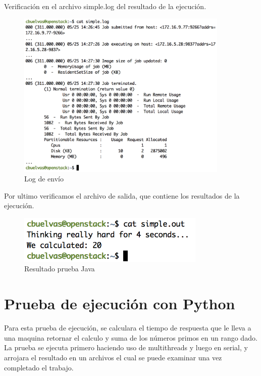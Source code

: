 Verificación en el archivo simple.log del resultado de la ejecución.

\begin{figure}[h]
\centering
\includegraphics[width=0.9\textwidth]{images/sublog.png}
\decoRule
\caption{Log de envío}
\label{fig:file log}
\end{figure}
\FloatBarrier

Por ultimo verificamos el archivo de salida, que contiene los resultados de la ejecución.

\begin{figure}[h]
\centering
\includegraphics[width=0.8\textwidth]{images/simpleout.png}
\decoRule
\caption{Resultado prueba Java}
\label{fig:file log}
\end{figure}
\FloatBarrier

\section{Prueba de ejecución con Python}

Para esta prueba de ejecución, se calculara el tiempo de respuesta que le lleva a una maquina retornar el calculo y suma de los números primos en un rango dado. La prueba se ejecuta primero haciendo uso de multithreads y luego en serial, y arrojara el resultado en un archivos el cual se puede examinar una vez completado el trabajo.

